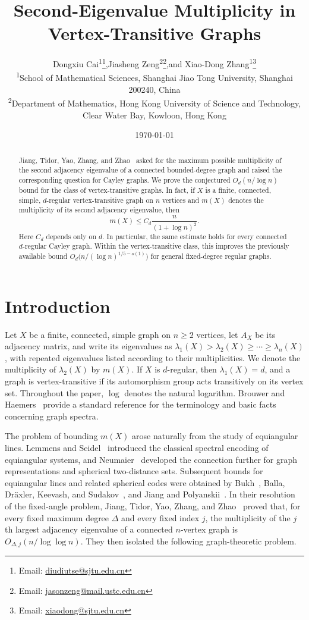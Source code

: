 \documentclass[11pt]{article}
\title{Second-Eigenvalue Multiplicity in Vertex-Transitive Graphs}
\author{Dongxiu Cai\textsuperscript{1}\thanks{Email: \href{mailto:diudiutse@sjtu.edu.cn}{diudiutse@sjtu.edu.cn}},\quad Jiasheng Zeng\textsuperscript{2}\thanks{Email: \href{mailto:jasonzeng@mail.ustc.edu.cn}{jasonzeng@mail.ustc.edu.cn}},\quad and Xiao-Dong Zhang\textsuperscript{1}\thanks{Email: \href{mailto:xiaodong@sjtu.edu.cn}{xiaodong@sjtu.edu.cn}}\\[0.7em]
{\small \textsuperscript{1}School of Mathematical Sciences, Shanghai Jiao Tong University, Shanghai 200240, China}\\
{\small \textsuperscript{2}Department of Mathematics, Hong Kong University of Science and Technology,}\\[-0.1em]
{\small Clear Water Bay, Kowloon, Hong Kong}}
\date{\today}
\theoremstyle{definition}
\theoremstyle{remark}
\begin{document}
\maketitle

\begin{abstract}
Jiang, Tidor, Yao, Zhang, and Zhao~\cite[Question~6.3]{JiangTidorYaoZhangZhao2021FixedAngle} asked for the maximum possible multiplicity of the second adjacency eigenvalue of a connected bounded-degree graph and raised the corresponding question for Cayley graphs. We prove the conjectured $O_d(n/\log n)$ bound for the class of vertex-transitive graphs. In fact, if $X$ is a finite, connected, simple, $d$-regular vertex-transitive graph on $n$ vertices and $m(X)$ denotes the multiplicity of its second adjacency eigenvalue, then
\[
m(X)\leq C_d\frac{n}{(1+\log n)^2}.
\]
Here $C_d$ depends only on $d$. In particular, the same estimate holds for every connected $d$-regular Cayley graph. Within the vertex-transitive class, this improves the previously available bound $O_d\bigl(n/(\log n)^{1/5-o(1)}\bigr)$ for general fixed-degree regular graphs.
\end{abstract}

\section{Introduction}\label{sec:introduction}

Let $X$ be a finite, connected, simple graph on $n\geq2$ vertices, let $A_X$ be its adjacency matrix, and write its eigenvalues as $\lambda_1(X)>\lambda_2(X)\geq\cdots\geq\lambda_n(X)$, with repeated eigenvalues listed according to their multiplicities. We denote the multiplicity of $\lambda_2(X)$ by $m(X)$. If $X$ is $d$-regular, then $\lambda_1(X)=d$, and a graph is vertex-transitive if its automorphism group acts transitively on its vertex set. Throughout the paper, $\log$ denotes the natural logarithm. Brouwer and Haemers~\cite{BrouwerHaemers2012Spectra} provide a standard reference for the terminology and basic facts concerning graph spectra.

The problem of bounding $m(X)$ arose naturally from the study of equiangular lines. Lemmens and Seidel~\cite{LemmensSeidel1973Equiangular} introduced the classical spectral encoding of equiangular systems, and Neumaier~\cite{Neumaier1989GraphRepresentations} developed the connection further for graph representations and spherical two-distance sets. Subsequent bounds for equiangular lines and related spherical codes were obtained by Bukh~\cite{Bukh2016Equiangular}, Balla, Dr\"axler, Keevash, and Sudakov~\cite{BallaDraxlerKeevashSudakov2018Equiangular}, and Jiang and Polyanskii~\cite{JiangPolyanskii2020Forbidden}. In their resolution of the fixed-angle problem, Jiang, Tidor, Yao, Zhang, and Zhao~\cite[Theorem~2.2]{JiangTidorYaoZhangZhao2021FixedAngle} proved that, for every fixed maximum degree $\Delta$ and every fixed index $j$, the multiplicity of the $j$th largest adjacency eigenvalue of a connected $n$-vertex graph is $O_{\Delta,j}(n/\log\log n)$. They then isolated the following graph-theoretic problem.
\end{document}
